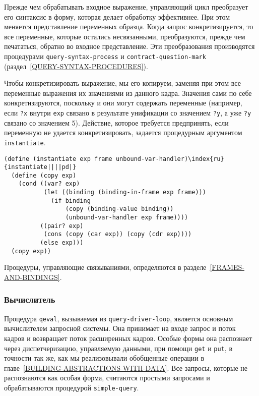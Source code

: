 Прежде чем обрабатывать входное выражение, управляющий
цикл преобразует его  синтаксис в форму, которая делает обработку
эффективнее.  При этом меняется  представление переменных 
образца.
Когда запрос конкретизируется, то все переменные, которые остались
несвязанными, преобразуются, прежде чем печататься, обратно во входное
представление.  Эти преобразования производятся процедурами
{\tt query-syntax-process} и
{\tt contract-question-mark} 
(раздел~\ref{QUERY-SYNTAX-PROCEDURES}).

Чтобы  конкретизировать выражение, мы его копируем,
заменяя при этом все переменные выражения их значениями из данного
кадра.  Значения сами по себе конкретизируются, поскольку и они могут
содержать переменные (например, если {\tt ?x} внутри
{\tt exp} связано в результате унификации со значением
{\tt ?y}, а уже {\tt ?y} связано со значением
5). Действие, которое требуется предпринять, если переменную не
удается конкретизировать, задается процедурным аргументом
{\tt instantiate}.

\begin{Verbatim}[fontsize=\small]
(define (instantiate exp frame unbound-var-handler)\index{ru}{instantiate||||pd|}
  (define (copy exp)
    (cond ((var? exp)
           (let ((binding (binding-in-frame exp frame)))
             (if binding
                 (copy (binding-value binding))
                 (unbound-var-handler exp frame))))
          ((pair? exp)
           (cons (copy (car exp)) (copy (cdr exp))))
          (else exp)))
  (copy exp))
\end{Verbatim}
Процедуры, управляющие связываниями, определяются в 
разделе~\ref{FRAMES-AND-BINDINGS}.

\subsubsection{Вычислитель}
\label{THE-EVALUATOR}%


Процедура {\tt qeval}, вызываемая из
{\tt query-driver-loop}, является основным вычислителем
запросной системы. Она принимает на входе запрос и поток кадров и
возвращает поток расширенных кадров.  Особые формы она распознает
через диспетчеризацию, управляемую данными, при помощи {\tt get}
и {\tt put}, в точности так же, как мы реализовывали обобщенные
операции в главе~\ref{BUILDING-ABSTRACTIONS-WITH-DATA}.
Все запросы, которые не распознаются как особая форма, считаются
простыми запросами и обрабатываются процедурой
{\tt simple-query}.

